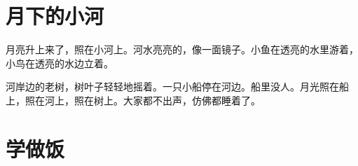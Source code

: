 \documentclass[12pt,UTF-8,openany]{ctexbook}
\begin{document}
\hanzibox{}\hanzibox{}\hanzibox{}\hanzibox{}\hspace{1em}\hanzibox{}\hanzibox{}\hanzibox{}\hanzibox{}

\hanzibox{}\hanzibox{}\hanzibox{}\hanzibox{}\hspace{1em}\hanzibox{}\hanzibox{}\hanzibox{}\hanzibox{}

\hanzibox{}\hanzibox{}\hanzibox{}\hanzibox{}\hspace{1em}\hanzibox{}\hanzibox{}\hanzibox{}\hanzibox{}






\chapter{月下的小河}

\begin{large}
    
    月亮升上来了，照在小河上。河水亮亮的，像一面镜子。小鱼在透亮的水里游着，小鸟在透亮的水边立着。
    
    河岸边的老树，树叶子轻轻地摇着。一只小船停在河边。船里没人。月光照在船上，照在河上，照在树上。大家都不出声，仿佛都睡着了。
    
\end{large}


\clearpage

\begin{center}
    
\end{center}


\hanzibox{}\hanzibox{}\hanzibox{}\hanzibox{}\hspace{1em}\hanzibox{}\hanzibox{}\hanzibox{}\hanzibox{}

\hanzibox{}\hanzibox{}\hanzibox{}\hanzibox{}\hspace{1em}\hanzibox{}\hanzibox{}\hanzibox{}\hanzibox{}

\hanzibox{}\hanzibox{}\hanzibox{}\hanzibox{}\hspace{1em}




\chapter{学做饭}
\end{document}
